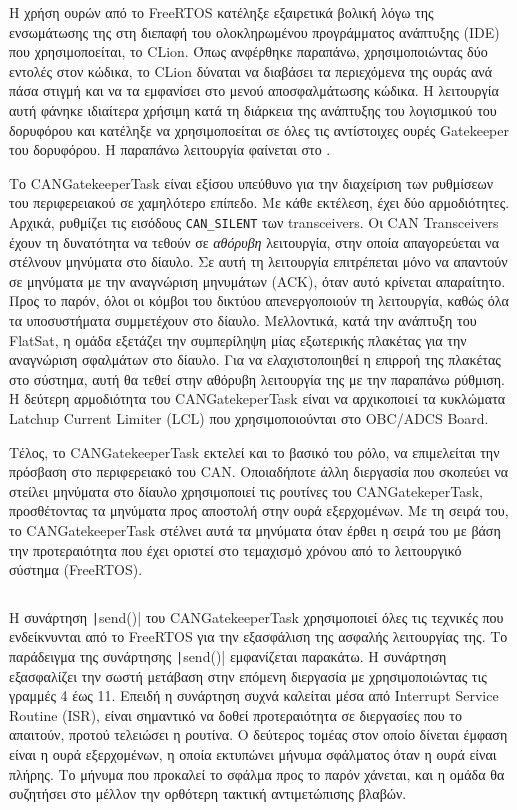 \documentclass[a4paper,nobib,justified]{tufte-book}
\begin{document}
\par Η χρήση ουρών από το FreeRTOS κατέληξε εξαιρετικά βολική λόγω της ενσωμάτωσης της στη διεπαφή του ολοκληρωμένου προγράμματος ανάπτυξης (IDE) που χρησιμοποείται, το CLion. Όπως ανφέρθηκε παραπάνω, χρησιμοποιώντας δύο εντολές στον κώδικα, το CLion δύναται να διαβάσει τα περιεχόμενα της ουράς ανά πάσα στιγμή και να τα εμφανίσει στο μενού αποσφαλμάτωσης κώδικα. Η λειτουργία αυτή φάνηκε ιδιαίτερα χρήσιμη κατά τη διάρκεια της ανάπτυξης του λογισμικού του δορυφόρου και κατέληξε να χρησιμοποείται σε όλες τις αντίστοιχες ουρές Gatekeeper του δορυφόρου. Η παραπάνω λειτουργία φαίνεται στο .

\FloatBarrier

Το CANGatekeeperTask είναι εξίσου υπεύθυνο για την διαχείριση των ρυθμίσεων του περιφερειακού σε χαμηλότερο επίπεδο. Με κάθε εκτέλεση, έχει δύο αρμοδιότητες. Αρχικά, ρυθμίζει τις εισόδους \texttt{CAN\_SILENT} των transceivers. Οι CAN Transceivers έχουν τη δυνατότητα να τεθούν σε \textit{αθόρυβη} λειτουργία, στην οποία απαγορεύεται να στέλνουν μηνύματα στο δίαυλο. Σε αυτή τη λειτουργία επιτρέπεται μόνο να απαντούν σε μηνύματα με την αναγνώριση μηνυμάτων (ACK), όταν αυτό κρίνεται απαραίτητο. Προς το παρόν, όλοι οι κόμβοι του δικτύου απενεργοποιούν τη λειτουργία, καθώς όλα τα υποσυστήματα συμμετέχουν στο δίαυλο. Μελλοντικά, κατά την ανάπτυξη του FlatSat, η ομάδα εξετάζει την συμπερίληψη μίας εξωτερικής πλακέτας για την αναγνώριση σφαλμάτων στο δίαυλο. Για να ελαχιστοποιηθεί η επιρροή της πλακέτας στο σύστημα, αυτή θα τεθεί στην αθόρυβη λειτουργία της με την παραπάνω ρύθμιση. Η δεύτερη αρμοδιότητα του CANGatekeperTask είναι να αρχικοποιεί τα κυκλώματα Latchup Current Limiter (LCL) που χρησιμοποιούνται στο OBC/ADCS Board. 

 Τέλος, το CANGatekeeperTask εκτελεί και το βασικό του ρόλο, να επιμελείται την πρόσβαση στο περιφερειακό του CAN. Οποιαδήποτε άλλη διεργασία που σκοπεύει να στείλει μηνύματα στο δίαυλο χρησιμοποιεί τις ρουτίνες του CANGatekeperTask, προσθέτοντας τα μηνύματα προς αποστολή στην ουρά εξερχομένων. Με τη σειρά του, το CANGatekeeperTask στέλνει αυτά τα μηνύματα όταν έρθει η σειρά του με βάση την προτεραιότητα που έχει οριστεί στο τεμαχισμό χρόνου από το λειτουργικό σύστημα (FreeRTOS).
\inputminted{c++}{code/examples/gatekeeper-execute.cpp}

Η συνάρτηση \texttt|send()| του CANGatekeeperTask χρησιμοποιεί όλες τις τεχνικές που ενδείκνυνται από το FreeRTOS για την εξασφάλιση της ασφαλής λειτουργίας της. Το παράδειγμα της συνάρτησης \texttt|send()| εμφανίζεται παρακάτω. Η συνάρτηση εξασφαλίζει την σωστή μετάβαση στην επόμενη διεργασία με χρησιμοποιώντας τις γραμμές 4 έως 11. Επειδή η συνάρτηση συχνά καλείται μέσα από Interrupt Service Routine (ISR), είναι σημαντικό να δοθεί προτεραιότητα σε διεργασίες που το απαιτούν, προτού τελειώσει η ρουτίνα. Ο δεύτερος τομέας στον οποίο δίνεται έμφαση είναι η ουρά εξερχομένων, η οποία εκτυπώνει μήνυμα σφάλματος όταν η ουρά είναι πλήρης. Το μήνυμα που προκαλεί το σφάλμα προς το παρόν χάνεται, και η ομάδα θα συζητήσει στο μέλλον την ορθότερη τακτική αντιμετώπισης βλαβών. 
\inputminted{c++}{code/examples/gatekeeper-send.cpp}
\end{document}
